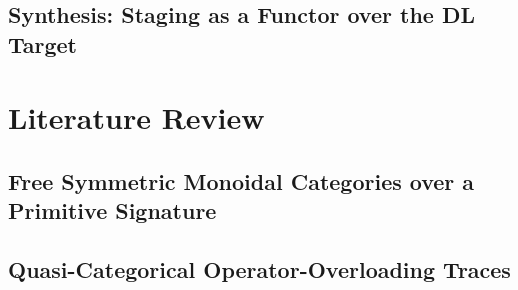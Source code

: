 \documentclass[11pt]{report}
\theoremstyle{definition}
\begin{document}
\begin{mainf}
\section{Synthesis: Staging as a Functor over the DL Target}
\label{sec:foundations-synthesis}



%
%

\chapter{Literature Review}
\label{ch:litreview}


\section{Free Symmetric Monoidal Categories over a Primitive Signature}
\label{sec:litreview-free-smc}


\section{Quasi-Categorical Operator-Overloading Traces}
\label{sec:litreview-tracing}



\end{mainf}
\end{document}
